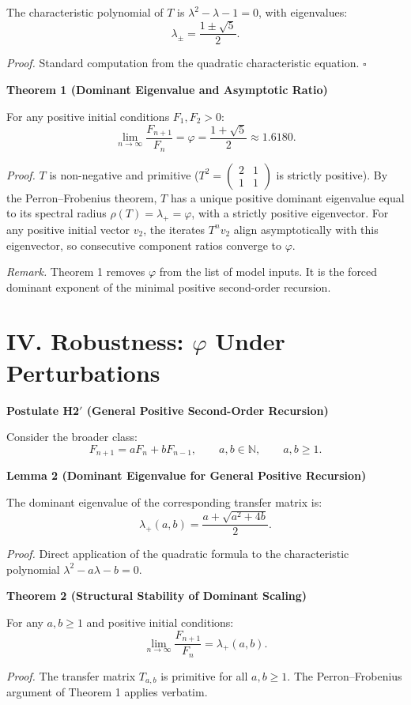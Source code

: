 \documentclass[12pt]{article}
\newcommand{\ph}{\varphi}
\newcommand{\N}{\mathbb{N}}
\begin{document}
The characteristic polynomial of $T$ is $\lambda^2-\lambda-1=0$, with eigenvalues:
\[
\lambda_{\pm}=\frac{1\pm\sqrt{5}}{2}.
\]

\textit{Proof.} Standard computation from the quadratic characteristic equation. $\square$

\textbf{Theorem 1 (Dominant Eigenvalue and Asymptotic Ratio)}

For any positive initial conditions $F_1,F_2>0$:
\[
\lim_{n\to\infty}\frac{F_{n+1}}{F_n}=\ph=\frac{1+\sqrt{5}}{2}\approx 1.6180.
\]

\textit{Proof.} $T$ is non-negative and primitive ($T^2=\begin{pmatrix}2&1\\1&1\end{pmatrix}$ is strictly positive). By the Perron--Frobenius theorem, $T$ has a unique positive dominant eigenvalue equal to its spectral radius $\rho(T)=\lambda_+=\ph$, with a strictly positive eigenvector. For any positive initial vector $v_2$, the iterates $T^n v_2$ align asymptotically with this eigenvector, so consecutive component ratios converge to $\ph$.

\textit{Remark.} Theorem 1 removes $\ph$ from the list of model inputs. It is the forced dominant exponent of the minimal positive second-order recursion.

\section*{IV. Robustness: $\ph$ Under Perturbations}
\textbf{Postulate H2$'$ (General Positive Second-Order Recursion)}

Consider the broader class:
\[
F_{n+1}=aF_n+bF_{n-1}, \qquad a,b\in\N, \qquad a,b\ge 1.
\]

\textbf{Lemma 2 (Dominant Eigenvalue for General Positive Recursion)}

The dominant eigenvalue of the corresponding transfer matrix is:
\[
\lambda_+(a,b)=\frac{a+\sqrt{a^2+4b}}{2}.
\]

\textit{Proof.} Direct application of the quadratic formula to the characteristic polynomial $\lambda^2-a\lambda-b=0$.

\textbf{Theorem 2 (Structural Stability of Dominant Scaling)}

For any $a,b\ge 1$ and positive initial conditions:
\[
\lim_{n\to\infty}\frac{F_{n+1}}{F_n}=\lambda_+(a,b).
\]

\textit{Proof.} The transfer matrix $T_{a,b}$ is primitive for all $a,b\ge 1$. The Perron--Frobenius argument of Theorem 1 applies verbatim.
\end{document}
